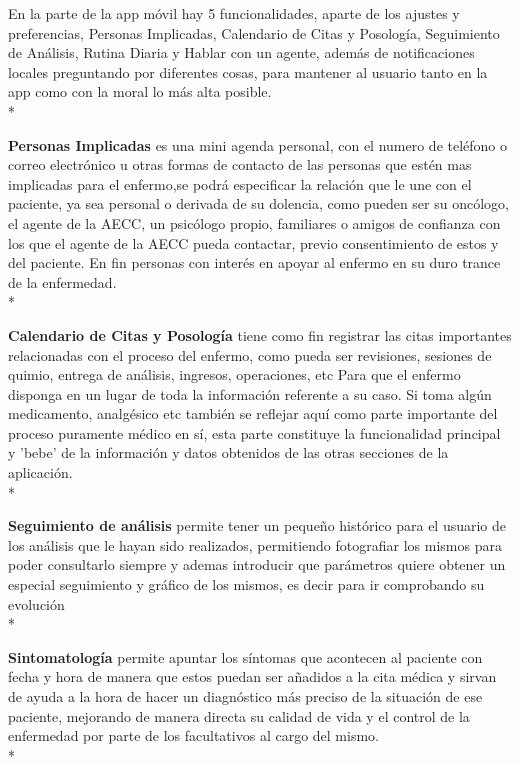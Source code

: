 \documentclass[../pfc.tex]{subfiles}
\begin{document}
	En la parte de la app móvil hay 5 funcionalidades, aparte de los ajustes y preferencias, Personas Implicadas, Calendario de Citas y Posología, Seguimiento de Análisis, Rutina Diaria y Hablar con un agente, además de notificaciones locales preguntando por diferentes cosas, para mantener al usuario tanto en la app como con la moral lo más alta posible.\\*
	
	\textbf{Personas Implicadas} es una mini agenda personal, con el numero de teléfono o correo electrónico u otras formas de contacto de las personas que estén mas implicadas para el enfermo,se podrá especificar la relación que le une con el paciente, ya sea personal o derivada de su dolencia, como pueden ser su oncólogo, el agente de la AECC, un psicólogo propio, familiares o amigos de confianza con los que el agente de la AECC pueda contactar, previo consentimiento de estos y del paciente. En fin personas con interés en apoyar al enfermo en su duro trance de la enfermedad.\\*
	
	\textbf{Calendario de Citas y Posología} tiene como fin registrar las citas importantes relacionadas con el proceso del enfermo, como pueda ser revisiones, sesiones de quimio, entrega de análisis, ingresos, operaciones, etc Para que el enfermo disponga en un lugar de toda la información referente a su caso. Si toma algún medicamento, analgésico etc también se reflejar aquí como parte importante del proceso puramente médico en sí, esta parte constituye la funcionalidad principal y 'bebe' de la información y datos obtenidos de las otras secciones de la aplicación.\\*
	
	\textbf{Seguimiento de análisis} permite tener un pequeño histórico para el usuario de los análisis que le hayan sido realizados, permitiendo fotografiar los mismos para poder consultarlo siempre y ademas introducir que parámetros quiere obtener un especial seguimiento y gráfico de los mismos, es decir para ir comprobando su evolución \\*
	
	\textbf{Sintomatología} permite apuntar los síntomas que acontecen al paciente con fecha y hora de manera que estos puedan ser añadidos a la cita médica y sirvan de ayuda a la hora de hacer un diagnóstico más preciso de la situación de ese paciente, mejorando de manera directa su calidad de vida y el control de la enfermedad por parte de los facultativos al cargo del mismo.\\*
	
\end{document}
